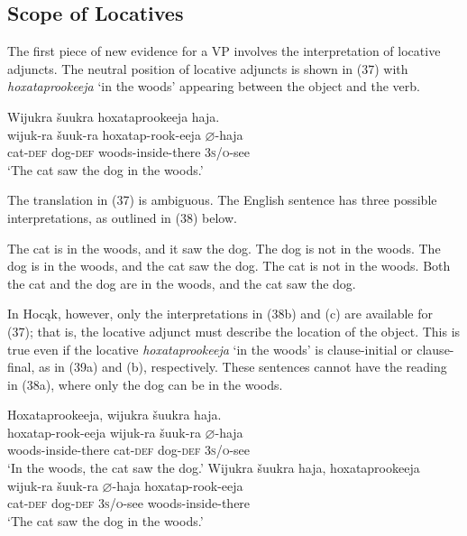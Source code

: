\documentclass[output=paper]{LSP/langsci}
\begin{document}
\subsection{Scope of Locatives}

The first piece of new evidence for a VP involves the interpretation of locative adjuncts. The neutral position of locative adjuncts is shown in (37) with \textit{hoxataprookeeja} `in the woods' appearing between the object and the verb.

\begin{exe}
\ex 
\glll Wijukra	\v{s}uukra		hoxataprookeeja		haja.\\
wijuk-ra	\v{s}uuk-ra		hoxatap-rook-eeja		$\varnothing$-haja \\
cat-\textsc{def}		dog-\textsc{def} 	woods-inside-there	\textsc{3s/o}-see \\
\trans `The cat saw the dog in the woods.' 
\end{exe}

The translation in (37) is ambiguous. The English sentence has three possible interpretations, as outlined in (38) below.

\begin{exe}
\ex 
\begin{xlist}
\ex The cat is in the woods, and it saw the dog. The dog is not in the woods. 
\ex The dog is in the woods, and the cat saw the dog. The cat is not in the woods.
\ex Both the cat and the dog are in the woods, and the cat saw the dog.
\end{xlist}
\end{exe}

In Hoc\k{a}k, however, only the interpretations in (38b) and (c) are available for (37); that is, the locative adjunct must describe the location of the object. This is true even if the locative \textit{hoxataprookeeja} `in the woods' is clause-initial or clause-final, as in (39a) and (b), respectively. These sentences cannot have the reading in (38a), where only the dog can be in the woods.

\begin{exe}
\ex
\begin{xlist}
\ex 
\glll Hoxataprookeeja, 		wijukra	\v{s}uukra			haja.\\
hoxatap-rook-eeja		wijuk-ra	\v{s}uuk-ra		$\varnothing$-haja \\
	woods-inside-there 	cat-\textsc{def}		dog-\textsc{def}		\textsc{3s/o}-see \\
\trans `In the woods, the cat saw the dog.'
\ex 
\glll Wijukra	\v{s}uukra			haja,				hoxataprookeeja\\
wijuk-ra	\v{s}uuk-ra		$\varnothing$-haja			hoxatap-rook-eeja \\
	cat-\textsc{def}		dog-\textsc{def}		\textsc{3s/o}-see	woods-inside-there \\
\trans `The cat saw the dog in the woods.'
\end{xlist}
\end{exe}
	
\end{document}
